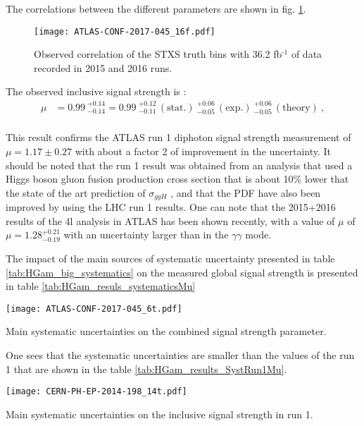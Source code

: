 The correlations between the different parameters are shown in fig. \ref{fig:org1ee6f2b}.

\begin{figure}[htbp]
\centering
\texttt{[image: ATLAS-CONF-2017-045\_16f.pdf]}
\caption{\label{fig:org1ee6f2b}
Observed correlation of the STXS truth bins with 36.2 fb\(^{\text{-1}}\) of data recorded in 2015 and 2016 runs.\cite{ATLAS-CONF-2017-045}}
\end{figure}


The observed inclusive signal strength is :
\begin{align*}
  \mu &= 0.99\ ^{+0.14}_{-0.14} = 0.99\ ^{+0.12}_{-0.11}\,\mathrm{(stat.)}\ ^{+0.06}_{-0.05}\,\mathrm{(exp.)}\ ^{+0.06}_{-0.05}\,\mathrm{(theory)} \ ,\\
\end{align*}

This result confirms the ATLAS run 1 diphoton signal strength measurement of $\mu = 1.17 \pm 0.27$ with about a factor 2 of improvement in the uncertainty.
It should be noted that the run 1 result was obtained from an analysis that used a Higgs boson gluon fusion production cross section \cite{CERN-2013-004} that is about 10\% lower that the state of the art prediction of $\sigma_{ggH}$ \cite{CERN-PH-TH-2015-055,CERN-TH-2016-006}, and that the PDF have also been improved by using the LHC run 1 results.
One can note that the 2015+2016 results of the 4l analysis in ATLAS \cite{ATLAS-CONF-2017-043} has been shown recently, with a value of $\mu$ of $\mu=1.28^{+0.21}_{-0.19}$ with an uncertainty larger than in the $\gamma\gamma$ mode.

The impact of the main sources of systematic uncertainty presented in table \ref{tab:HGam_big_systematics} on the measured global signal strength is presented in table \ref{tab:HGam_resuls_systematicsMu}

\begin{table}
  \centering
  \texttt{[image: ATLAS-CONF-2017-045\_6t.pdf]}
  \caption{Main systematic uncertainties on the combined signal strength parameter.\cite{ATLAS-CONF-2017-045}}
  \label{tab:HGam_resuls_systematicsMu}
\end{table}

One sees that the systematic uncertainties are smaller than the values of the run 1 \cite{CERN-PH-EP-2014-198} that are shown in the table \ref{tab:HGam_results_SystRun1Mu}.


\begin{table}
  \centering
  \texttt{[image: CERN-PH-EP-2014-198\_14t.pdf]}
  \caption{Main systematic uncertainties on the inclusive signal strength in run 1. \cite{CERN-PH-EP-2014-198}}
  \label{tab:HGam_results_SystRun1Mu}
\end{table}

